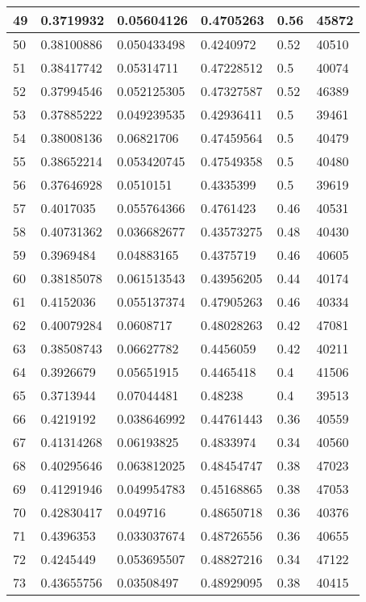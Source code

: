 \begin{longtable}{|l|l|l|l|l|l|}
49 & 0.3719932 & 0.05604126 & 0.4705263 & 0.56 & 45872 \\ \hline 
50 & 0.38100886 & 0.050433498 & 0.4240972 & 0.52 & 40510 \\ \hline 
51 & 0.38417742 & 0.05314711 & 0.47228512 & 0.5 & 40074 \\ \hline 
52 & 0.37994546 & 0.052125305 & 0.47327587 & 0.52 & 46389 \\ \hline 
53 & 0.37885222 & 0.049239535 & 0.42936411 & 0.5 & 39461 \\ \hline 
54 & 0.38008136 & 0.06821706 & 0.47459564 & 0.5 & 40479 \\ \hline 
55 & 0.38652214 & 0.053420745 & 0.47549358 & 0.5 & 40480 \\ \hline 
56 & 0.37646928 & 0.0510151 & 0.4335399 & 0.5 & 39619 \\ \hline 
57 & 0.4017035 & 0.055764366 & 0.4761423 & 0.46 & 40531 \\ \hline 
58 & 0.40731362 & 0.036682677 & 0.43573275 & 0.48 & 40430 \\ \hline 
59 & 0.3969484 & 0.04883165 & 0.4375719 & 0.46 & 40605 \\ \hline 
60 & 0.38185078 & 0.061513543 & 0.43956205 & 0.44 & 40174 \\ \hline 
61 & 0.4152036 & 0.055137374 & 0.47905263 & 0.46 & 40334 \\ \hline 
62 & 0.40079284 & 0.0608717 & 0.48028263 & 0.42 & 47081 \\ \hline 
63 & 0.38508743 & 0.06627782 & 0.4456059 & 0.42 & 40211 \\ \hline 
64 & 0.3926679 & 0.05651915 & 0.4465418 & 0.4 & 41506 \\ \hline 
65 & 0.3713944 & 0.07044481 & 0.48238 & 0.4 & 39513 \\ \hline 
66 & 0.4219192 & 0.038646992 & 0.44761443 & 0.36 & 40559 \\ \hline 
67 & 0.41314268 & 0.06193825 & 0.4833974 & 0.34 & 40560 \\ \hline 
68 & 0.40295646 & 0.063812025 & 0.48454747 & 0.38 & 47023 \\ \hline 
69 & 0.41291946 & 0.049954783 & 0.45168865 & 0.38 & 47053 \\ \hline 
70 & 0.42830417 & 0.049716 & 0.48650718 & 0.36 & 40376 \\ \hline 
71 & 0.4396353 & 0.033037674 & 0.48726556 & 0.36 & 40655 \\ \hline 
72 & 0.4245449 & 0.053695507 & 0.48827216 & 0.34 & 47122 \\ \hline 
73 & 0.43655756 & 0.03508497 & 0.48929095 & 0.38 & 40415 \\ \hline 

\end{longtable}
